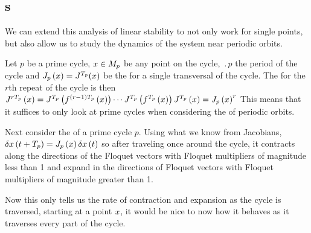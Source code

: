 \subsection{\Po s}{
\label{sect:SFpos}

We can extend this analysis of linear stability to not only
work for single points, but also allow us to study the
dynamics of the system near periodic orbits.

Let $p$ be a prime cycle, $x \in M_p$ be any point on the
cycle, $\period{p}$ the period of the cycle and
$J_p\left(x\right) = J^{{T_{p}}}(x)$ be
the {\jacobianM} for a single transversal of the cycle.
The {\jacobianM} for the $r$th repeat of the cycle is then
$J^{r
{T_{p}}}\left(x\right)=J^{{T_{p}}}\left(f^{\left(r-1\right)
{T_{p}}}\left(x\right)\right) \cdots
J^{{T_{p}}}\left(f^{{T_{p}}}\left(x\right)\right)J^{{T_{p}}}\left(x\right)
=J_p\left(x\right)^r$
This means that it suffices to only look at prime cycles when
considering the {\jacobianMs} of periodic orbits.

Next consider the {\jacobianM} of a prime cycle $p$.
Using what we know from Jacobians,
$\delta x \left(t+{T_{p}}\right)
=J_p\left(x\right)\delta x\left(t\right)$
so after traveling once around the cycle, it contracts along
the directions of the Floquet vectors with Floquet
multipliers of magnitude less than 1 and expand in the
directions of Floquet vectors with Floquet multipliers of
magnitude greater than 1.

Now this only tells us the rate of contraction and expansion
as the cycle is traversed, starting at a point $x$, it
would be nice to now how it behaves as it traverses every
part of the cycle.

}
